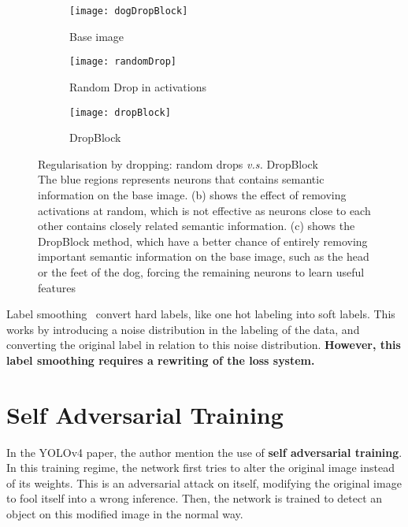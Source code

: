 \begin{figure}[H]
	\begin{subfigure}[t]{.3\textwidth}
  \centering
  \texttt{[image: dogDropBlock]}
  \caption{Base image}
  \label{fig:dropBlockA}
\end{subfigure}
	\begin{subfigure}[t]{.3\textwidth}
  \centering
  \texttt{[image: randomDrop]}  
  \caption{Random Drop in activations}
  \label{fig:dropBlockB}
\end{subfigure}
	\begin{subfigure}[t]{.3\textwidth}
  \centering
  \texttt{[image: dropBlock]}  
  \caption{DropBlock}
  \label{fig:dropBlockC}
\end{subfigure}
	\caption[Regularisation by dropping: random drops \textit{v.s.} DropBlock]{Regularisation by dropping: random drops \textit{v.s.} DropBlock\\The blue regions represents neurons that contains semantic information on the base image. (b) shows the effect of removing activations at random, which is not effective as neurons close to each other contains closely related semantic information. (c) shows the DropBlock method, which have a better chance of entirely removing important semantic information on the base image, such as the head or the feet of the dog, forcing the remaining neurons to learn useful features}
\label{fig:dropBlock}
\end{figure}

Label smoothing~\cite{labelSmooth} convert hard labels, like one hot labeling into soft labels. This works by introducing a noise distribution in the labeling of the data, and converting the original label in relation to this noise distribution. \textbf{However, this label smoothing requires a rewriting of the loss system.}

\section{Self Adversarial Training}
In the YOLOv4\cite{yolov4} paper, the author mention the use of \textbf{self adversarial training}. In this training regime, the network first tries to alter the original image instead of its weights. This is an adversarial attack on itself, modifying the original image to fool itself into a wrong inference. Then, the network is trained to detect an object on this modified image in the normal way.


